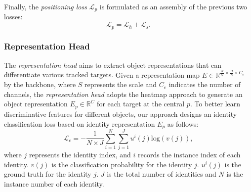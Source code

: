 \documentclass[acmsmall]{acmart}
\begin{document}
{Finally,} the \emph{positioning loss} $\mathcal{L}_{p}$ is {formulated} as an assembly of the previous two losses:
\begin{equation} \label{equ:position_loss}
\mathcal{L}_{p} = \mathcal{L}_{h} + \mathcal{L}_{s}.
\end{equation}

\subsubsection{Representation Head}
{T}he \emph{representation head} {aims} to extract object representations that can differentiate various tracked targets. 
{
Given a representation map $E \in \mathbb{R}^{\frac{W}{S} \times \frac{H}{S} \times C_e}$ by the backbone, where $S$ represents the scale and $C_e$ indicates the number of channels, 
the \emph{representation head} adopts the heatmap approach to generate an object representation $E_{p} \in \mathbb{R}^{C}$ for each target at the central $p$.
To better learn discriminative features for different objects, our approach designs an identity classification loss based on identity representation $E_{p}$ as follows: 
\begin{equation} \label{equ:classification_loss}
\mathcal{L}_{c} = - \frac{1}{N \times J} \sum_{i=1}^{N} \sum_{j=1}^{J} u^i{(j)} \text{log}(v(j)),
\end{equation}
where $j$ represents the identity index, 
and $i$ records the instance index of each identity. 
$v(j)$ is the classification probability for the identity $j$. 
$u^i(j)$ is the ground truth for the identity $j$. 
}
$J$ is the total number of identities {and $N$ is the instance number of each identity}. 
\end{document}
